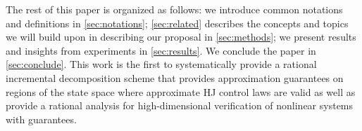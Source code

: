 The rest of this paper is organized as follows: we introduce common notations and definitions in \autoref{sec:notations}; \autoref{sec:related} describes the concepts and topics we will build upon in describing our proposal in \autoref{sec:methods}; we present results and insights from experiments in \autoref{sec:results}. We  conclude the paper in \autoref{sec:conclude}. This work is the first to systematically provide a rational incremental decomposition scheme that provides approximation guarantees on regions of the state space where approximate HJ control laws are valid as well as provide a rational analysis for high-dimensional verification of nonlinear systems with guarantees.  %